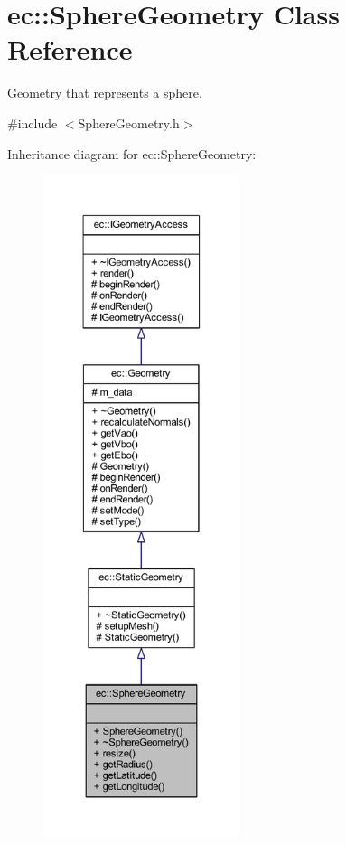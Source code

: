 \hypertarget{classec_1_1_sphere_geometry}{}\section{ec\+:\+:Sphere\+Geometry Class Reference}
\label{classec_1_1_sphere_geometry}


\mbox{\hyperlink{classec_1_1_geometry}{Geometry}} that represents a sphere.  




{\ttfamily \#include $<$Sphere\+Geometry.\+h$>$}



Inheritance diagram for ec\+:\+:Sphere\+Geometry\+:\nopagebreak
\begin{figure}[H]
\begin{center}
\leavevmode
\includegraphics[height=550pt]{classec_1_1_sphere_geometry__inherit__graph}
\end{center}
\end{figure}


